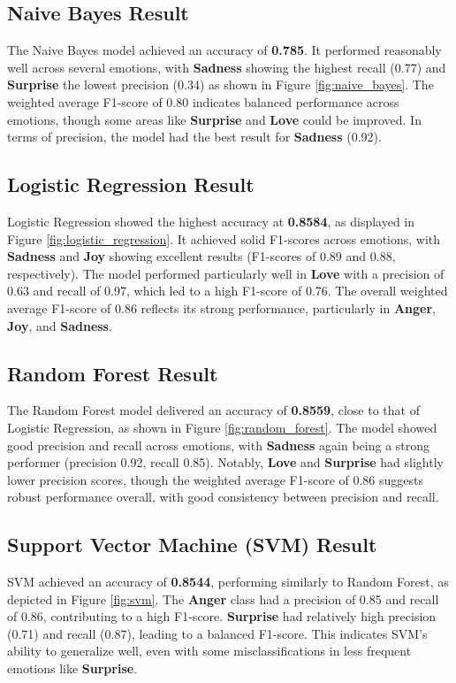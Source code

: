 \clearpage
\subsection{Naive Bayes Result}
The Naive Bayes model achieved an accuracy of \textbf{0.785}. It performed reasonably well across several emotions, with \textbf{Sadness} showing the highest recall (0.77) and \textbf{Surprise} the lowest precision (0.34) as shown in Figure \ref{fig:naive_bayes}. The weighted average F1-score of 0.80 indicates balanced performance across emotions, though some areas like \textbf{Surprise} and \textbf{Love} could be improved. In terms of precision, the model had the best result for \textbf{Sadness} (0.92).

\subsection{Logistic Regression Result}
Logistic Regression showed the highest accuracy at \textbf{0.8584}, as displayed in Figure \ref{fig:logistic_regression}. It achieved solid F1-scores across emotions, with \textbf{Sadness} and \textbf{Joy} showing excellent results (F1-scores of 0.89 and 0.88, respectively). The model performed particularly well in \textbf{Love} with a precision of 0.63 and recall of 0.97, which led to a high F1-score of 0.76. The overall weighted average F1-score of 0.86 reflects its strong performance, particularly in \textbf{Anger}, \textbf{Joy}, and \textbf{Sadness}.

\subsection{Random Forest Result}
The Random Forest model delivered an accuracy of \textbf{0.8559}, close to that of Logistic Regression, as shown in Figure \ref{fig:random_forest}. The model showed good precision and recall across emotions, with \textbf{Sadness} again being a strong performer (precision 0.92, recall 0.85). Notably, \textbf{Love} and \textbf{Surprise} had slightly lower precision scores, though the weighted average F1-score of 0.86 suggests robust performance overall, with good consistency between precision and recall.

\subsection{Support Vector Machine (SVM) Result}
SVM achieved an accuracy of \textbf{0.8544}, performing similarly to Random Forest, as depicted in Figure \ref{fig:svm}. The \textbf{Anger} class had a precision of 0.85 and recall of 0.86, contributing to a high F1-score. \textbf{Surprise} had relatively high precision (0.71) and recall (0.87), leading to a balanced F1-score. This indicates SVM's ability to generalize well, even with some misclassifications in less frequent emotions like \textbf{Surprise}.

